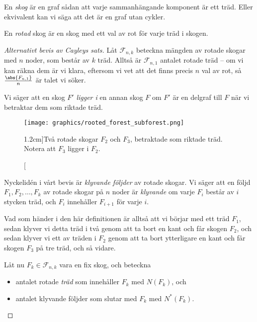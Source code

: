 \documentclass[nobib]{tufte-handout}
\begin{document}
\begin{definition}
    En \emph{skog} är en graf sådan att varje sammanhängande komponent är ett träd. Eller ekvivalent kan vi säga att det är en graf utan cykler.

    En \emph{rotad} skog är en skog med ett val av rot för varje träd i skogen.
\end{definition}

\begin{proof}[Alternativt bevis av Cayleys sats]
    Låt $\mathcal{F}_{n,k}$ beteckna mängden av rotade skogar med $n$ noder, som består av $k$ träd. Alltså är $\mathcal{F}_{n,1}$ antalet rotade träd -- om vi kan räkna dem är vi klara, eftersom vi vet att det finns precis $n$ val av rot, så $\frac{\abs{F_{n,1}}}{n}$ är talet vi söker.

    Vi säger att en skog $F'$ \emph{ligger i} en annan skog $F$ om $F'$ är en delgraf till $F$ när vi betraktar dem som riktade träd.

    \begin{figure}
        \centering
        \texttt{[image: graphics/rooted\_forest\_subforest.png]}
        \caption[][1.2cm]{Två rotade skogar $F_2$ och $F_3$, betraktade som riktade träd. Notera att $F_3$ ligger i $F_2$.}
        \label{fig:two_rooted_forests}
    \end{figure}

    Nyckelidén i vårt bevis är \emph{klyvande följder} av rotade skogar. Vi säger att en följd $F_1, F_2,\ldots, F_k$ av rotade skogar på $n$ noder är \emph{klyvande} om varje $F_i$ består av $i$ stycken träd, och $F_{i}$ innehåller $F_{i+1}$ för varje $i$.

    Vad som händer i den här definitionen är alltså att vi börjar med ett träd $F_1$, sedan klyver vi detta träd i två genom att ta bort en kant och får skogen $F_2$, och sedan klyver vi ett av träden i $F_2$ genom att ta bort ytterligare en kant och får skogen $F_3$ på tre träd, och så vidare.

    Låt nu $F_k \in \mathcal{F}_{n,k}$ vara en fix skog, och beteckna
    \begin{itemize}
        \item antalet rotade \emph{träd} som innehåller $F_k$ med $N(F_k)$, och
        \item antalet klyvande följder som slutar med $F_k$ med $N^*(F_k)$.
    \end{itemize}


\end{proof}
\end{document}
